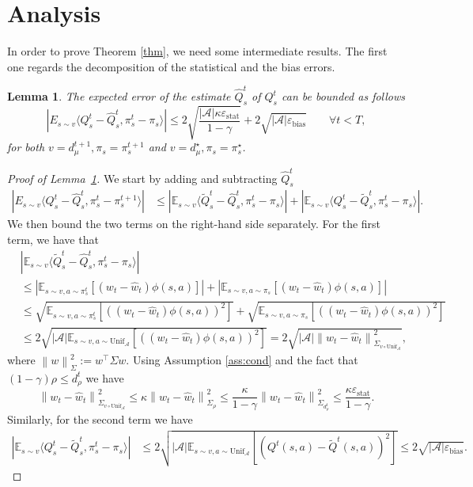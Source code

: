 \documentclass[a4paper,12pt]{article}
\newtheorem{lemma}[theorem]{Lemma}
\numberwithin{theorem}{section}
\newcommand\E{\mathbb{E}}
\newcommand\A{\mathcal{A}}
\newcommand\1{\mathbf{1}}
\newcommand{\norm}[1]{\left\lVert #1 \right\rVert}
\begin{document}
\section{Analysis}
\label{sec:analysis}
In order to prove Theorem \ref{thm}, we need some intermediate results. The first one regards the decomposition of the statistical and the bias errors.
\begin{lemma}
	\label{lemma:appr}
	The expected error of the estimate $\widehat{Q}_s^t$ of $Q_s^t$ can be bounded as follows
	\[\left|E_{s\sim v}\langle Q_s^t-\widehat{Q}_s^t,\pi^t_s - \pi_s\rangle\right|\leq 2\sqrt{\frac{|\A|\kappa\varepsilon_\text{stat}}{1-\gamma}}+ 2\sqrt{|\A|\varepsilon_\text{bias}}\qquad \forall t < T,\]
	for both $v = d_\mu^{t+1}, \pi_s = \pi^{t+1}_s$ and $v = d_\mu^\star, \pi_s = \pi^\star_s$.
\end{lemma}
\begin{proof}[Proof of Lemma~\ref{lemma:appr}]
	We start by adding and subtracting $\widehat{Q}_s^t$
	\begin{align*}
		\left|E_{s\sim v}\langle Q_s^t-\widehat{Q}_s^t,\pi^t_s - \pi^{t+1}_s\rangle\right|&\leq \left|\E_{s\sim v}\langle \widetilde{Q}_s^t-\widehat{Q}_s^t,\pi^t_s-\pi_s\rangle\right|+ \left|\E_{s\sim v}\langle Q_s^t-\widetilde{Q}_s^t,\pi^t_s-\pi_s\rangle\right|.
	\end{align*}
	We then bound the two terms on the right-hand side separately. For the first term, we have that
	\begin{align*}
		&\left|\E_{s\sim v}\langle \widetilde{Q}_s^t-\widehat{Q}_s^t,\pi^t_s-\pi_s\rangle\right|\\ 
		&\leq\left|\E_{s\sim v, a \sim \pi^t_s}\left[( w_t-\widehat{w}_t)\phi(s,a)\right]\right|+\left|\E_{s\sim v, a \sim \pi_s}\left[( w_t-\widehat{w}_t)\phi(s,a)\right]\right|\\
		&\leq \sqrt{\E_{s\sim v, a \sim \pi^t_s}\left[\left(( w_t-\widehat{w}_t)\phi(s,a)\right)^2\right]}
		+\sqrt{\E_{s\sim v, a \sim \pi_s}\left[\left(( w_t-\widehat{w}_t)\phi(s,a)\right)^2\right]}\\
		&\leq2\sqrt{|\A|\E_{s\sim v, a \sim \text{Unif}_{\A}}\left[\left(( w_t-\widehat{w}_t)\phi(s,a)\right)^2\right]}= 2\sqrt{|\A|\norm{ w_t-\widehat{w}_t}^2_{\Sigma_{v\circ\text{Unif}_{\A}}}},
	\end{align*}
	where $\norm{w}^2_\Sigma:=w^\top\Sigma w$. Using Assumption \ref{ass:cond} and the fact that $(1-\gamma)\rho\leq d^t_\rho$ we have
	\[\norm{ w_t-\widehat{w}_t}^2_{\Sigma_{v\circ\text{Unif}_{\A}}}\leq\kappa\norm{ w_t-\widehat{w}_t}^2_{\Sigma_{\rho}}\leq\frac{\kappa}{1-\gamma}\norm{ w_t-\widehat{w}_t}^2_{\Sigma_{d_\rho^{t}}}\leq\frac{\kappa\varepsilon_\text{stat}}{1-\gamma}.\]
	Similarly, for the second term we have 
	\begin{align*}
		\left|\E_{s\sim v}\langle Q_s^t-\widetilde{Q}_s^t,\pi^t_s-\pi_s\rangle\right|&\leq2\sqrt{|\A|\E_{s\sim v, a \sim \text{Unif}_{\A}}\left[\left( Q^t(s,a)-\widetilde{Q}^t(s,a)\right)^2\right]}\leq 2\sqrt{|\A|\varepsilon_\text{bias}}.
	\end{align*}\end{proof}
\end{document}
